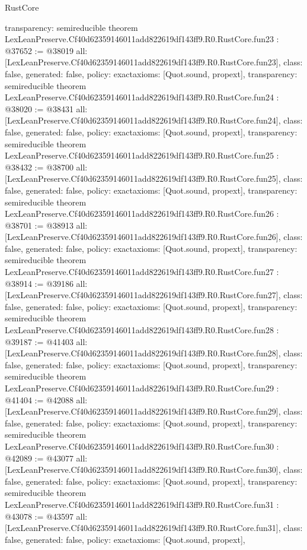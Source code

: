 \begin{lexlean}{RustCore}
\begin{coremodule}
{  transparency: semireducible
}
theorem LexLeanPreserve.Cf40d62359146011add822619df143ff9.R0.RustCore.fun23 : @37652 := @38019 {
  all: [LexLeanPreserve.Cf40d62359146011add822619df143ff9.R0.RustCore.fun23],
  class: false,
  generated: false,
  policy: exact{axioms: [Quot.sound, propext]},
  transparency: semireducible
}
theorem LexLeanPreserve.Cf40d62359146011add822619df143ff9.R0.RustCore.fun24 : @38020 := @38431 {
  all: [LexLeanPreserve.Cf40d62359146011add822619df143ff9.R0.RustCore.fun24],
  class: false,
  generated: false,
  policy: exact{axioms: [Quot.sound, propext]},
  transparency: semireducible
}
theorem LexLeanPreserve.Cf40d62359146011add822619df143ff9.R0.RustCore.fun25 : @38432 := @38700 {
  all: [LexLeanPreserve.Cf40d62359146011add822619df143ff9.R0.RustCore.fun25],
  class: false,
  generated: false,
  policy: exact{axioms: [Quot.sound, propext]},
  transparency: semireducible
}
theorem LexLeanPreserve.Cf40d62359146011add822619df143ff9.R0.RustCore.fun26 : @38701 := @38913 {
  all: [LexLeanPreserve.Cf40d62359146011add822619df143ff9.R0.RustCore.fun26],
  class: false,
  generated: false,
  policy: exact{axioms: [Quot.sound, propext]},
  transparency: semireducible
}
theorem LexLeanPreserve.Cf40d62359146011add822619df143ff9.R0.RustCore.fun27 : @38914 := @39186 {
  all: [LexLeanPreserve.Cf40d62359146011add822619df143ff9.R0.RustCore.fun27],
  class: false,
  generated: false,
  policy: exact{axioms: [Quot.sound, propext]},
  transparency: semireducible
}
theorem LexLeanPreserve.Cf40d62359146011add822619df143ff9.R0.RustCore.fun28 : @39187 := @41403 {
  all: [LexLeanPreserve.Cf40d62359146011add822619df143ff9.R0.RustCore.fun28],
  class: false,
  generated: false,
  policy: exact{axioms: [Quot.sound, propext]},
  transparency: semireducible
}
theorem LexLeanPreserve.Cf40d62359146011add822619df143ff9.R0.RustCore.fun29 : @41404 := @42088 {
  all: [LexLeanPreserve.Cf40d62359146011add822619df143ff9.R0.RustCore.fun29],
  class: false,
  generated: false,
  policy: exact{axioms: [Quot.sound, propext]},
  transparency: semireducible
}
theorem LexLeanPreserve.Cf40d62359146011add822619df143ff9.R0.RustCore.fun30 : @42089 := @43077 {
  all: [LexLeanPreserve.Cf40d62359146011add822619df143ff9.R0.RustCore.fun30],
  class: false,
  generated: false,
  policy: exact{axioms: [Quot.sound, propext]},
  transparency: semireducible
}
theorem LexLeanPreserve.Cf40d62359146011add822619df143ff9.R0.RustCore.fun31 : @43078 := @43597 {
  all: [LexLeanPreserve.Cf40d62359146011add822619df143ff9.R0.RustCore.fun31],
  class: false,
  generated: false,
  policy: exact{axioms: [Quot.sound, propext]},
}
\end{coremodule}
\end{lexlean}
